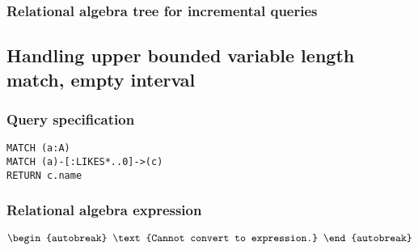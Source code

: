 \subsubsection*{Relational algebra tree for incremental queries}


\subsection{Handling upper bounded variable length match, empty interval}

\subsubsection*{Query specification}

\begin{lstlisting}
MATCH (a:A)
MATCH (a)-[:LIKES*..0]->(c)
RETURN c.name
\end{lstlisting}

\subsubsection*{Relational algebra expression}

\begin{align*}
\begin{autobreak}
\text{Cannot convert to expression.}
\end{autobreak}
\end{align*}

